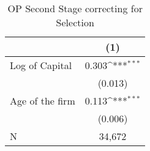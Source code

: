 \begin{table}[htbp]\centering
\def\sym#1{\ifmmode^{#1}\else\(^{#1}\)\fi}
\caption{OP Second Stage correcting for Selection \label{tab:q5d}}
\begin{tabular}{l*{1}{c}}
\toprule
                    &\multicolumn{1}{c}{(1)}         \\
\midrule
Log of Capital      &       0.303\sym{***}\\
                    &     (0.013)         \\
\addlinespace
Age of the firm     &       0.113\sym{***}\\
                    &     (0.006)         \\
\midrule
N                   &      34,672         \\
\bottomrule
\end{tabular}
\end{table}

